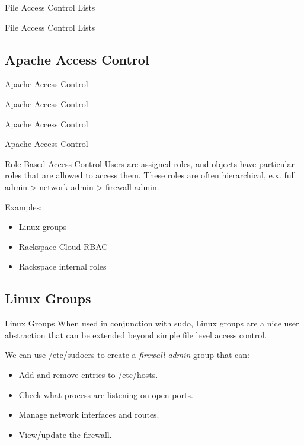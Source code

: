 \documentclass{beamer}
\begin{document}
\begin{frame}{File Access Control Lists}

\end{frame}

\begin{frame}{File Access Control Lists}

\end{frame}

\subsection{Apache Access Control}

\begin{frame}{Apache Access Control}

\end{frame}

\begin{frame}{Apache Access Control}

\end{frame}

\begin{frame}{Apache Access Control}

\end{frame}

\begin{frame}{Apache Access Control}

\end{frame}

\begin{frame}{Role Based Access Control}
Users are assigned roles, and objects have particular roles that are allowed to access them.
These roles are often hierarchical, e.x. full admin > network admin > firewall admin.

Examples:
\begin{itemize}
\item Linux groups
\item Rackspace Cloud RBAC
\item Rackspace internal roles
\end{itemize}
\end{frame}

\subsection{Linux Groups}

\begin{frame}{Linux Groups}
When used in conjunction with sudo, Linux groups are a nice user abstraction that can be extended beyond simple file level access control.

We can use /etc/sudoers to create a \textit{firewall-admin} group that can:
\begin{itemize}
\item Add and remove entries to /etc/hosts.
\item Check what process are listening on open ports.
\item Manage network interfaces and routes.
\item View/update the firewall.
\end{itemize}
\end{frame}
\end{document}
